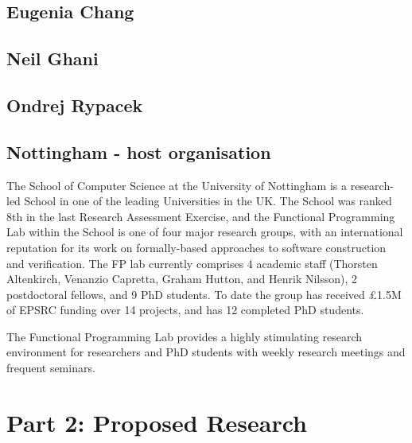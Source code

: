 \documentclass[a4paper]{article}
\renewcommand{\cite}[1]{{\tt #1}}
\newcommand{\citetrack}[1]{\cite{#1}}
\begin{document}
\subsection*{Eugenia Chang}

\subsection*{Neil Ghani}

\subsection*{Ondrej Rypacek}


\subsection*{Nottingham - host organisation}

The School of Computer Science at the University of Nottingham
is a research-led School in one of the leading Universities in
the UK.	 The School was ranked 8th in the last Research Assessment
Exercise, and the Functional Programming Lab within the School is
one of four major research groups, with an international reputation
for its work on formally-based approaches to software construction
and verification.  The FP lab currently comprises 4 academic staff
(Thorsten Altenkirch, Venanzio Capretta, Graham Hutton, and Henrik
Nilsson), 2 postdoctoral fellows, and 9 PhD students.  To date the
group has received \pounds 1.5M of EPSRC funding over 14 projects,
and has 12 completed PhD students.

The Functional Programming Lab provides a highly stimulating
research environment for researchers and PhD students with weekly
research meetings and frequent seminars. 



\newpage

\section*{Part 2: Proposed Research}
\end{document}

